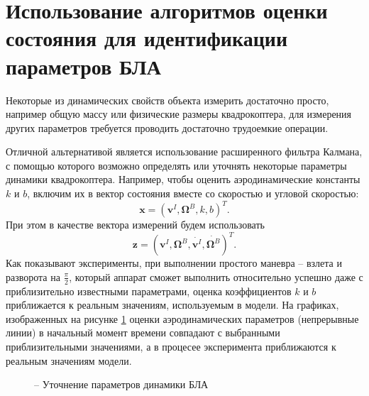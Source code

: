 \section{Использование алгоритмов оценки состояния для идентификации параметров БЛА}

Некоторые из динамических свойств объекта измерить достаточно просто, например общую массу или физические размеры квадрокоптера, для измерения других параметров требуется проводить достаточно трудоемкие операции.

Отличной альтернативой является использование расширенного фильтра Калмана, с помощью которого возможно определять или уточнять некоторые параметры динамики квадрокоптера. Например, чтобы оценить аэродинамические константы $k$ и $b$, включим их в вектор состояния вместе со скоростью и угловой скоростью:
\begin{equation}
\bm x = (\bm v^I, \bm \Omega^B, k, b)^T.
\end{equation}
При этом в качестве вектора измерений будем использовать
\begin{equation}
\bm z = (\bm v^I, \bm \Omega^B, \dot{\bm v^I}, \dot{\bm \Omega^B})^T.
\end{equation}
Как показывают эксперименты, при выполнении простого маневра -- взлета и разворота на $\frac{\pi}{2}$, который аппарат сможет выполнить относительно успешно даже с приблизительно известными параметрами, оценка коэффициентов $k$ и $b$
приближается к реальным значениям, используемым в модели. На графиках, изображенных на рисунке \ref{fig:observer_k_b} оценки аэродинамических параметров (непрерывные линии) в начальный момент времени совпадают с выбранными приблизительными значениями, а в процесее эксперимента приближаются к реальным значениям модели.
\begin{figure}[h!]
	\centering
	\quad
	\caption{ -- Уточнение параметров динамики БЛА}
	\label{fig:observer_k_b}
\end{figure}
